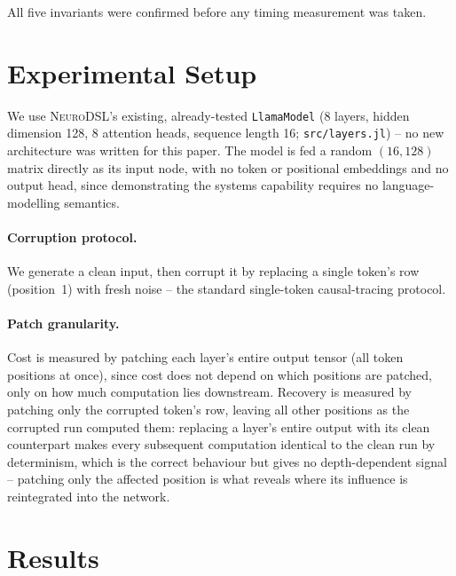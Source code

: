 \documentclass{article}
\begin{document}
All five invariants were confirmed before any timing measurement was taken.

\section{Experimental Setup}
\label{sec:setup}

We use \textsc{NeuroDSL}'s existing, already-tested \texttt{LlamaModel} (8 layers, hidden
dimension 128, 8 attention heads, sequence length 16; \texttt{src/layers.jl}) -- no new
architecture was written for this paper. The model is fed a random $(16, 128)$ matrix directly
as its input node, with no token or positional embeddings and no output head, since demonstrating
the systems capability requires no language-modelling semantics.

\paragraph{Corruption protocol.} We generate a clean input, then corrupt it by replacing a single
token's row (position~1) with fresh noise -- the standard single-token causal-tracing protocol.

\paragraph{Patch granularity.} Cost is measured by patching each layer's entire output tensor
(all token positions at once), since cost does not depend on which positions are patched, only on
how much computation lies downstream. Recovery is measured by patching only the corrupted
token's row, leaving all other positions as the corrupted run computed them: replacing a layer's
entire output with its clean counterpart makes every subsequent computation identical to the
clean run by determinism, which is the correct behaviour but gives no depth-dependent signal --
patching only the affected position is what reveals where its influence is reintegrated into the
network.

\section{Results}
\label{sec:results}
\end{document}
